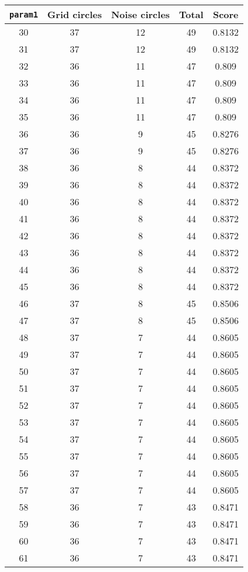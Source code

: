 \documentclass[letterpaper, 12pt]{article}
\begin{document}
\begin{longtable}{|c|c|c|c|c|}
\hline
\textbf{\texttt{param1}} & \textbf{Grid circles} & \textbf{Noise circles} & \textbf{Total} & \textbf{Score} \\
\hline
30 & 37 & 12 & 49 & 0.8132 \\
\hline
31 & 37 & 12 & 49 & 0.8132 \\
\hline
32 & 36 & 11 & 47 & 0.809 \\
\hline
33 & 36 & 11 & 47 & 0.809 \\
\hline
34 & 36 & 11 & 47 & 0.809 \\
\hline
35 & 36 & 11 & 47 & 0.809 \\
\hline
36 & 36 & 9 & 45 & 0.8276 \\
\hline
37 & 36 & 9 & 45 & 0.8276 \\
\hline
38 & 36 & 8 & 44 & 0.8372 \\
\hline
39 & 36 & 8 & 44 & 0.8372 \\
\hline
40 & 36 & 8 & 44 & 0.8372 \\
\hline
41 & 36 & 8 & 44 & 0.8372 \\
\hline
42 & 36 & 8 & 44 & 0.8372 \\
\hline
43 & 36 & 8 & 44 & 0.8372 \\
\hline
44 & 36 & 8 & 44 & 0.8372 \\
\hline
45 & 36 & 8 & 44 & 0.8372 \\
\hline
46 & 37 & 8 & 45 & 0.8506 \\
\hline
47 & 37 & 8 & 45 & 0.8506 \\
\hline
48 & 37 & 7 & 44 & 0.8605 \\
\hline
49 & 37 & 7 & 44 & 0.8605 \\
\hline
50 & 37 & 7 & 44 & 0.8605 \\
\hline
51 & 37 & 7 & 44 & 0.8605 \\
\hline
52 & 37 & 7 & 44 & 0.8605 \\
\hline
53 & 37 & 7 & 44 & 0.8605 \\
\hline
54 & 37 & 7 & 44 & 0.8605 \\
\hline
55 & 37 & 7 & 44 & 0.8605 \\
\hline
56 & 37 & 7 & 44 & 0.8605 \\
\hline
57 & 37 & 7 & 44 & 0.8605 \\
\hline
58 & 36 & 7 & 43 & 0.8471 \\
\hline
59 & 36 & 7 & 43 & 0.8471 \\
\hline
60 & 36 & 7 & 43 & 0.8471 \\
\hline
61 & 36 & 7 & 43 & 0.8471 \\

\end{longtable}
\end{document}
